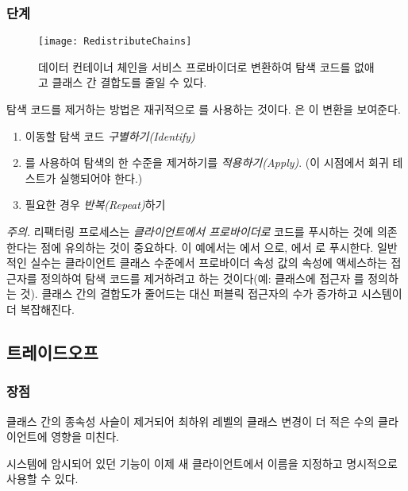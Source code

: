 \documentclass[a4paper,10pt,twoside]{book}
\begin{document}
\subsubsection*{단계}

\begin{figure}
\begin{center}
\texttt{[image: RedistributeChains]}
\caption{데이터 컨테이너 체인을 서비스 프로바이더로 변환하여 탐색 코드를 없애고 클래스 간 결합도를 줄일 수 있다.}
\end{center}
\end{figure}

탐색 코드를 제거하는 방법은 재귀적으로 를 사용하는 것이다. 은 이 변환을 보여준다.
\begin{enumerate}
\item 이동할 탐색 코드 \emph{구별하기(Identify)}
\item {}를 사용하여 탐색의 한 수준을 제거하기를 \emph{적용하기(Apply)}. (이 시점에서 회귀 테스트가 실행되어야 한다.)
\item 필요한 경우 \emph{반복(Repeat)}하기
\end{enumerate}

\noindent
\emph{주의.}
리팩터링 프로세스는 \emph{클라이언트에서 프로바이더로} 코드를 푸시하는 것에 의존한다는 점에 유의하는 것이 중요하다. 이 예에서는 에서 으로, 에서 로 푸시한다. 일반적인 실수는 클라이언트 클래스 수준에서 프로바이더 속성 값의 속성에 액세스하는 접근자를 정의하여 탐색 코드를 제거하려고 하는 것이다(예:  클래스에 접근자 를 정의하는 것). 클래스 간의 결합도가 줄어드는 대신 퍼블릭 접근자의 수가 증가하고 시스템이 더 복잡해진다.

\subsection*{트레이드오프}

\subsubsection*{장점}

\begin{bulletlist}
\item 클래스 간의 종속성 사슬이 제거되어 최하위 레벨의 클래스 변경이 더 적은 수의 클라이언트에 영향을 미친다.

\item 시스템에 암시되어 있던 기능이 이제 새 클라이언트에서 이름을 지정하고 명시적으로 사용할 수 있다.
\end{bulletlist}
\end{document}
